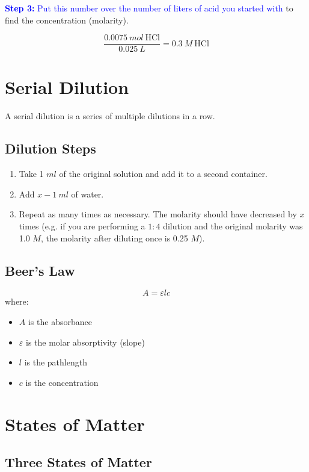 \documentclass[a4paper, 12pt]{article}
\begin{document}
\textcolor{blue}{\textbf{Step 3:} Put this number over the number of liters of acid you started with} to find the concentration (molarity).

$$\frac{0.0075 \: mol \: \text{HCl}}{0.025 \: L} = \boxed{0.3 \: M \: \text{HCl}}$$

\section{Serial Dilution}
A serial dilution is a series of multiple dilutions in a row.

\subsection{Dilution Steps}

\begin{enumerate}[leftmargin=*]
    \item Take 1 $ml$ of the original solution and add it to a second container.
    \item Add $x-1 \: ml$ of water.
    \item Repeat as many times as necessary. The molarity should have decreased by $x$ times (e.g. if you are performing a $1:4$ dilution and the original molarity was 1.0 $M$, the molarity after diluting once is 0.25 $M$).
\end{enumerate}

\subsection{Beer's Law}

\begin{equation}\label{beers}
A = \varepsilon l c
\end{equation}
where:
\begin{itemize}[leftmargin=*, nosep]
    \item $A$ is the absorbance
    \item $\varepsilon$ is the molar absorptivity (slope)
    \item $l$ is the pathlength
    \item $c$ is the concentration
\end{itemize}

\section{States of Matter}

\subsection{Three States of Matter}
\end{document}
